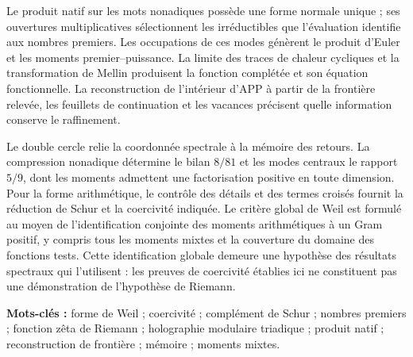 Le produit natif sur les mots nonadiques possède une forme normale unique ; ses ouvertures multiplicatives sélectionnent les irréductibles que l'évaluation identifie aux nombres premiers. Les occupations de ces modes génèrent le produit d'Euler et les moments premier--puissance. La limite des traces de chaleur cycliques et la transformation de Mellin produisent la fonction complétée et son équation fonctionnelle. La reconstruction de l'intérieur d'APP à partir de la frontière relevée, les feuillets de continuation et les vacances précisent quelle information conserve le raffinement.

Le double cercle relie la coordonnée spectrale à la mémoire des retours. La compression nonadique détermine le bilan $8/81$ et les modes centraux le rapport $5/9$, dont les moments admettent une factorisation positive en toute dimension. Pour la forme arithmétique, le contrôle des détails et des termes croisés fournit la réduction de Schur et la coercivité indiquée. Le critère global de Weil est formulé au moyen de l'identification conjointe des moments arithmétiques à un Gram positif, y compris tous les moments mixtes et la couverture du domaine des fonctions tests. Cette identification globale demeure une hypothèse des résultats spectraux qui l'utilisent : les preuves de coercivité établies ici ne constituent pas une démonstration de l'hypothèse de Riemann.

\medskip
\noindent\textbf{Mots-clés :} forme de Weil ; coercivité ;
complément de Schur ; nombres premiers ; fonction zêta de Riemann ;
holographie modulaire triadique ; produit natif ; reconstruction de
frontière ; mémoire ; moments mixtes.
\par\endgroup
